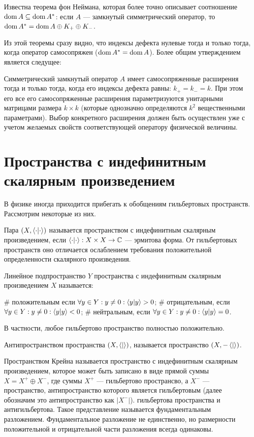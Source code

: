 Известна теорема фон Неймана, которая более точно описывает соотношение $\operatorname{dom} A \subseteq \operatorname{dom} A^*$: если $A$ — замкнутый симметрический оператор, то $\operatorname{dom} A^* = \operatorname{dom} A \oplus K_+ \oplus K_-$.

Из этой теоремы сразу видно, что индексы дефекта нулевые тогда и только тогда, когда оператор самосопряжен ($\operatorname{dom} A^* = \operatorname{dom} A$). Более общим утверждением является следущее:

Симметрический замкнутый оператор $A$ имеет самосопряженные расширения тогда и только тогда, когда его индексы дефекта равны: $k_+ = k_- = k$. При этом его все его самосопряженные расширения параметризуются унитарными матрицами размера $k \times k$ (которые однозначно определяются $k^2$ вещественными параметрами). Выбор конкретного расширения должен быть осуществлен уже с учетом желаемых свойств соответствующей оператору физической величины.
\section{Пространства с индефинитным скалярным произведением}
В физике иногда приходится прибегать к обобщениям гильбертовых пространств. Рассмотрим некоторые из них.


Пара $(X, \ipcdot)$ называется пространством с индефинитным скалярным произведением, если $\ipcdot: X \times X \to \bbC$ — эрмитова форма. От гильбертовых пространств оно отличается ослаблением требования положительной определенности скалярного произведения.

Линейное подпространство $Y$ пространства с индефинитным скалярным произведением $X$ называется:
\begin{ilist}
# положительным если $\forall y \in Y: y \ne 0: \ip{y}{y} > 0$;
# отрицательным, если $\forall y \in Y: y \ne 0: \ip{y}{y} < 0$;
# нейтральным, если $\forall y \in Y: y \ne 0: \ip{y}{y} = 0$.
\end{ilist}
В частности, любое гильбертово пространство полностью положительно.

Антипространством пространства $(X, \ip{}{})$, называется пространство $(X, -\ip{}{})$.

Пространством Крейна называется пространство с индефинитным скалярным произведением, которое может быть записано в виде прямой суммы $X = X^+ \oplus X^-$, где суммы $X^+$ — гильбертово пространсво, а $X^-$ — пространство, антипространство которого является гильбертовым (далее обозначим это антипространство как $|X^-|$). гильбертова пространства и антигильбертова. Такое представление называется фундаментальным разложением. Фундаментальное разложение не единственно, но размерности положительной и отрицательной части разложения всегда одинаковы.

